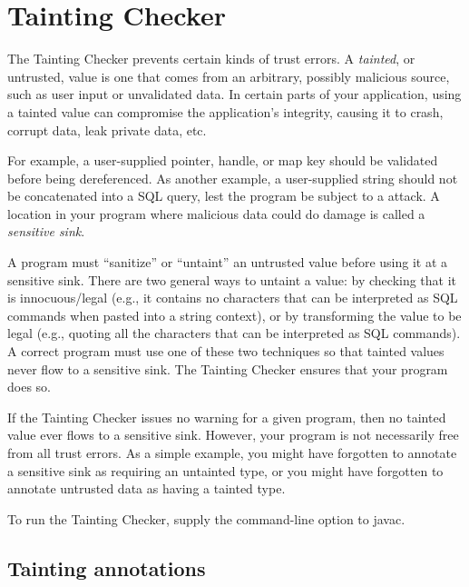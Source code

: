 \htmlhr
\chapter{Tainting Checker\label{tainting-checker}}

The Tainting Checker prevents certain kinds of trust errors.
A \emph{tainted}, or untrusted, value is one that comes from an arbitrary,
possibly malicious source, such as user input or unvalidated data.
In certain parts of your application, using a tainted value can compromise
the application's integrity, causing it to crash, corrupt data, leak
private data, etc.


For example, a user-supplied pointer, handle, or map key should be
validated before being dereferenced.
As another example, a user-supplied string should not be concatenated into a
SQL query, lest the program be subject to a 
 attack.
A location in your program where malicious data could do damage is
called a \emph{sensitive sink}.

A program must ``sanitize'' or ``untaint'' an untrusted value before using
it at a sensitive sink.  There are two general ways to untaint a value:
by checking
that it is innocuous/legal (e.g., it contains no characters that can be
interpreted as SQL commands when pasted into a string context), or by
transforming the value to be legal (e.g., quoting all the characters that
can be interpreted as SQL commands).  A correct program must use one of
these two techniques so that tainted values never flow to a sensitive sink.
The Tainting Checker ensures that your program does so.

If the Tainting Checker issues no warning for a given program, then no
tainted value ever flows to a sensitive sink.  However, your program is not
necessarily free from all trust errors.  As a simple example, you might
have forgotten to annotate a sensitive sink as requiring an untainted type,
or you might have forgotten to annotate untrusted data as having a tainted
type.

To run the Tainting Checker, supply the  command-line option to javac.


\section{Tainting annotations\label{tainting-annotations}}

